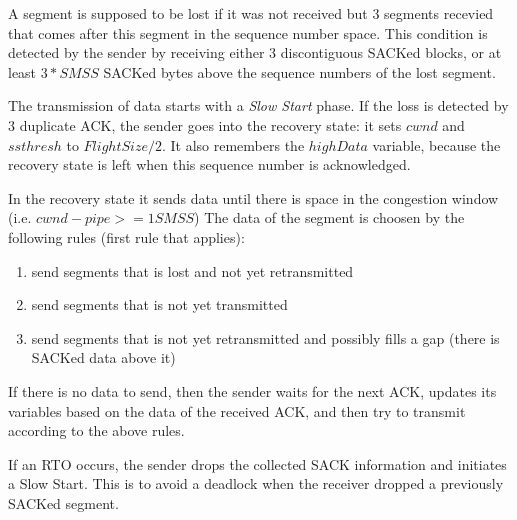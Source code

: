 A segment is supposed to be lost if it was not received
but 3 segments recevied that comes after this segment in the sequence
number space.
This condition is detected by the sender by receiving
either 3 discontiguous SACKed blocks, or at least
$3*SMSS$ SACKed bytes above the sequence numbers of the
lost segment.

The transmission of data starts with a \emph{Slow Start} phase.
If the loss is detected by 3 duplicate ACK, the sender
goes into the recovery state: it sets
$cwnd$ and $ssthresh$ to $FlightSize / 2$.
It also remembers the $highData$ variable, because
the recovery state is left when this sequence number
is acknowledged.

In the recovery state it sends data
until there is space in the congestion window (i.e. $cwnd-pipe >= 1 SMSS$)
The data of the segment is choosen by the following rules (first rule that applies):

\begin{enumerate}
  \item send segments that is lost and not yet retransmitted
  \item send segments that is not yet transmitted
  \item send segments that is not yet retransmitted and possibly fills a gap
        (there is SACKed data above it)
\end{enumerate}

If there is no data to send, then the sender waits for the next ACK, updates
its variables based on the data of the received ACK, and then try to transmit
according to the above rules.

If an RTO occurs, the sender drops the collected SACK information and
initiates a Slow Start. This is to avoid a deadlock when the receiver
dropped a previously SACKed segment.

